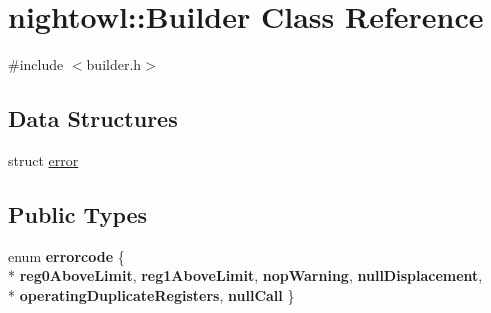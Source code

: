 \hypertarget{classnightowl_1_1Builder}{\section{nightowl\-:\-:Builder Class Reference}
\label{classnightowl_1_1Builder}
}


{\ttfamily \#include $<$builder.\-h$>$}

\subsection*{Data Structures}
\begin{DoxyCompactItemize}
\item 
struct \hyperlink{structnightowl_1_1Builder_1_1error}{error}
\end{DoxyCompactItemize}
\subsection*{Public Types}
\begin{DoxyCompactItemize}
\item 
enum {\bfseries errorcode} \{ \\*
{\bfseries reg0\-Above\-Limit}, 
{\bfseries reg1\-Above\-Limit}, 
{\bfseries nop\-Warning}, 
{\bfseries null\-Displacement}, 
\\*
{\bfseries operating\-Duplicate\-Registers}, 
{\bfseries null\-Call}
 \}
\end{DoxyCompactItemize}
